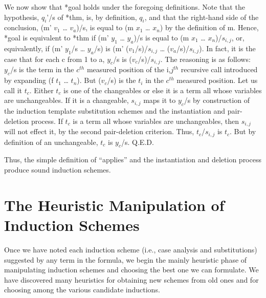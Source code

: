 \documentclass[11pt]{book}
\newcommand{\pubdefaulttextsize}{\large}
\begin{document}
We now show that *goal holds under the foregoing definitions.
Note that the hypothesis, $q_{i}$'/s of *thm, is, by definition,
$q_{i}$, and that the right-hand side of the conclusion, (m' $v_{1}$ \ldots{} $v_{a}$)/s,
is equal to (m $x_{1}$ \ldots{} $x_{n}$) by the definition of m.
Hence, *goal is equivalent to *thm
if (m' $y_{1}$ \ldots{} $y_{a}$)/s is equal to (m $x_{1}$ \ldots{} $x_{n}$)/$s_{i,j}$,
or, equivalently, if (m' $y_{1}$/s \ldots{} $y_{a}$/s) is
(m' ($v_{1}$/s)/$s_{i,j}$ \ldots{} ($v_{a}$/s)/$s_{i,j}$).  In fact, it is
the case that for each c from 1 to a, $y_{c}$/s is ($v_{c}$/s)/$s_{i,j}$.
The reasoning is as follows:~~$y_{c}$/s is the term in the $c^{th}$ measured
position of the i,$j^{th}$ recursive call introduced by expanding (f $t_{1}$ \ldots{} $t_{n}$).
But ($v_{c}$/s) is the $t_{i}$ in the $c^{th}$ measured position.
Let us call it $t_{c}$.  Either $t_{c}$ is one of the changeables or else it is a
term all whose variables are unchangeables.  If it is a changeable, $s_{i,j}$ maps it to
$y_{c}$/s by construction of the induction template substitution
schemes and the instantiation and pair-deletion process.  If $t_{c}$ is a term
all whose variables are unchangeables, then $s_{i,j}$ will not effect it, by the
second pair-deletion criterion.  Thus, $t_{c}$/$s_{i,j}$ is $t_{c}$.  But
by definition of an unchangeable, $t_{c}$ is $y_{c}$/s.  Q.E.D.

Thus, the simple definition of ``applies'' and the instantiation and deletion
process produce sound induction schemes.
\section{The Heuristic Manipulation of Induction Schemes}
\pubdefaulttextsize
Once we have noted each induction scheme (i.e., case analysis and
substitutions)  suggested
by any term in the formula, we begin the mainly heuristic phase of
manipulating induction schemes and choosing the best one we
can formulate.  We have discovered many heuristics for
obtaining new schemes from old ones  and for choosing among the various
candidate inductions.
\end{document}
